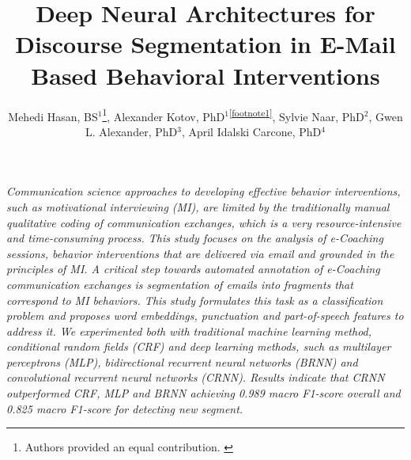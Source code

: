\documentclass{amia}
\begin{document}
\title{Deep Neural Architectures for Discourse Segmentation in E-Mail Based Behavioral Interventions}

\author{Mehedi Hasan, BS$^{1}$\footnote{Authors provided an equal contribution. \label{footnote1}}, Alexander Kotov, PhD$^{1}$\textsuperscript{\ref{footnote1}}, Sylvie Naar, PhD$^{2}$, Gwen L. Alexander, PhD$^{3}$, April Idalski Carcone, PhD$^{4}$}


\maketitle

\textit{Communication science approaches to developing effective behavior interventions, such as motivational interviewing (MI), are limited by the traditionally manual qualitative coding of communication exchanges, which is a very resource-intensive and time-consuming process. This study focuses on the analysis of e-Coaching sessions, behavior interventions that are delivered via email and grounded in the principles of MI. A critical step towards automated annotation of e-Coaching communication exchanges is segmentation of emails into fragments that correspond to MI behaviors. This study formulates this task as a classification problem and proposes word embeddings, punctuation and part-of-speech features to address it. We experimented both with traditional machine learning method, conditional random fields (CRF) and deep learning methods, such as multilayer perceptrons (MLP), bidirectional recurrent neural networks (BRNN) and convolutional recurrent neural networks (CRNN). Results indicate that CRNN outperformed CRF, MLP and BRNN achieving 0.989 macro F1-score overall and 0.825 macro F1-score for detecting new segment.}
\end{document}
